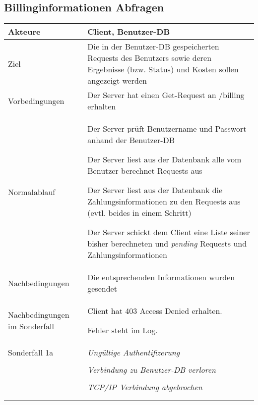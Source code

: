 \documentclass[a4paper,10pt,titlepage]{article}
\makeatletter
\newcommand\novspace{\@minipagetrue}
\newenvironment{owncompactitem}{%
\compactitem
}{%
\@finalstrut\@arstrutbox
\@nameuse{endcompactitem}%
\aftergroup\let\aftergroup\@finalstrut\aftergroup\@gobble
}
\newenvironment{owncompactenum}{%
\compactenum
}{%
\@finalstrut\@arstrutbox
\@nameuse{endcompactenum}%
\aftergroup\let\aftergroup\@finalstrut\aftergroup\@gobble
}
\newcommand{\usecase}[7]
{\subsection{#1}
\setlength{\extrarowheight}{2pt}
\begin{tabular}{|p{0.2\textwidth}|p{0.9\textwidth}|}
\hline
  Akteure & #2\\\hline
  Ziel & #3\\\hline
  Vorbedingungen & \novspace
  	\begin{owncompactitem}[-] #4 \end{owncompactitem} \\\hline
  Normalablauf & \vspace{-7pt}
  	\begin{owncompactenum}[1.] #6 \end{owncompactenum} \\\hline
  Nachbedingungen & \novspace
  	\begin{owncompactitem}[-] #5 \end{owncompactitem} \\\hline
  #7
\end{tabular}
}
\newcommand{\sonderfall}[4][\empty]
{
Sonderfall #2 & \vspace{-10pt}
	\textit{#3}
	\begin{owncompactenum}[{#2}.1] {#4} \end{owncompactenum}
  	\ifthenelse{\equal{#1}{\empty}}
    	{\\\hline} %
    	{\ensuremath{\rightarrow} #1 \\ [+1pt] \hline} %

}
\newcommand{\sondernachbedingung}[1]
{
Nachbedingungen im Sonderfall& \novspace
	\begin{owncompactitem}[-]
		#1
	\end{owncompactitem} \\\hline
}
\makeatother
\begin{document}
\usecase{Billinginformationen Abfragen}{Client, Benutzer-DB}%
{Die in der Benutzer-DB gespeicherten Requests des Benutzers sowie deren Ergebnisse (bzw. Status) und Kosten sollen angezeigt werden}%
{%
  \item Der Server hat einen Get-Request an /billing erhalten
}
{%
  \item Die entsprechenden Informationen wurden gesendet
}
{%
  \item Der Server prüft Benutzername und Passwort anhand der Benutzer-DB
  \item Der Server liest aus der Datenbank alle vom Benutzer berechnet Requests aus
  \item Der Server liest aus der Datenbank die Zahlungsinformationen zu den Requests aus (evtl. beides in einem Schritt)
  \item Der Server schickt dem Client eine Liste seiner bisher berechneten und \textit{pending} Requests und Zahlungsinformationen
}
{%
  \sondernachbedingung{
	\item Client hat 403 Access Denied erhalten.
	\item Fehler steht im Log.
	}
		\sonderfall[Weiter mit normalem Betrieb]{1a}
    {Ungültige Authentifizerung}
    {
    \item Fehler wird ins Log geschrieben
  	\item Der Client erhält eine entsprechende Fehlermeldung mit HTTP-Status 403 Access Denied
    }
	\sonderfall[Kritischer Fehler, Server ist beendet]{*}%
	{Verbindung zu Benutzer-DB verloren}%
  	{
	\item Der Fehler wird ins Log geschrieben (als schwerwiegender Fehler)
	\item Der Client erhält eine entsprechende Fehlermeldung
	\item Der Server wird beendet
  	}

\sonderfall[Weiter mit normalem Betrieb]{**}%
	{TCP/IP Verbindung abgebrochen}%
	{
	\item Fehlermeldung wird ins Log geschrieben
	}
}

\end{document}

